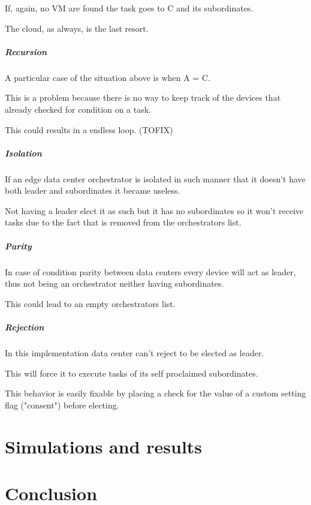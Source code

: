 \documentclass[12pt]{report}
\begin{document}
If, again, no VM are found the task goes to C and its subordinates.

The cloud, as always, is the last resort.


\paragraph{Recursion}
A particular case of the situation above is when A = C.

This is a problem because there is no way to keep track of the devices that already checked for condition on a task.

This could results in a endless loop. (TOFIX)


\paragraph{Isolation}
If an edge data center orchestrator is isolated in such manner that it doesn't have both leader and subordinates it became useless.

Not having a leader elect it as such but it has no subordinates so it won't receive tasks due to the fact that is removed from the orchestrators list.

\paragraph{Parity}
In case of condition parity between data centers every device will act as leader, thus not being an orchestrator neither having subordinates.

This could lead to an empty orchestrators list.

\paragraph{Rejection}
In this implementation data center can't reject to be elected as leader. 

This will force it to execute tasks of its self proclaimed subordinates.

This behavior is easily fixable by placing a check for the value of a custom setting flag ("consent") before electing.


\chapter{Simulations and results}

\chapter{Conclusion}

\printbibliography
\end{document}
